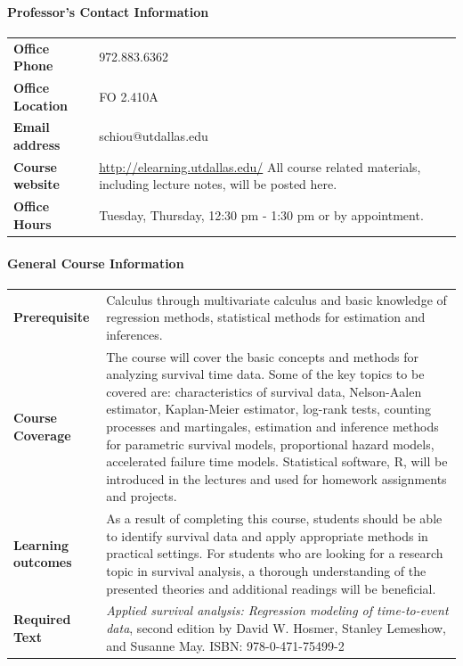 \documentclass[10pt]{article}
\begin{document}
\paragraph{Professor's Contact Information}
\begin{center}
\renewcommand{\arraystretch}{1.2}
\begin{tabular}{|p{} p{}|}
\hline
\textbf{Office Phone} & 972.883.6362 \\
\textbf{Office Location} & FO 2.410A\\
\textbf{Email address} & schiou@utdallas.edu\\
\textbf{Course website} & \url{http://elearning.utdallas.edu/} \newline
All course related materials, including lecture notes, will be posted here.\\
\textbf{Office Hours} & Tuesday, Thursday, 12:30 pm - 1:30 pm or by appointment.\\
\hline
\end{tabular}
\end{center}

\paragraph{General Course Information}
\begin{center}
\renewcommand{\arraystretch}{1.2}
\begin{tabular}{|p{} p{}|}
\hline
\textbf{Prerequisite} & Calculus through multivariate calculus and basic knowledge of regression methods, statistical methods for estimation and inferences. \\
[.5ex]
\textbf{Course Coverage} & The course will cover the basic concepts and methods for analyzing survival time data.
Some of the key topics to be covered are: 
characteristics of survival data, 
Nelson-Aalen estimator, Kaplan-Meier estimator, log-rank tests,
counting processes and martingales, 
estimation and inference methods for parametric survival models, proportional hazard models, accelerated failure time models.
Statistical software, R, will be introduced in the lectures and used for homework assignments and projects.\\
[.5ex]
\textbf{Learning outcomes} & 
As a result of completing this course, students should be able to identify survival data and apply appropriate methods in practical settings.
For students who are looking for a research topic in survival analysis, a thorough understanding of the presented theories and additional readings will be beneficial.
\\
[.5ex]
\textbf{Required Text} & \textit{Applied survival analysis: Regression modeling of time-to-event data}, second edition by David W. Hosmer, Stanley Lemeshow, and Susanne May.
ISBN: 978-0-471-75499-2\\
\hline
\end{tabular}
\end{center}
\end{document}
